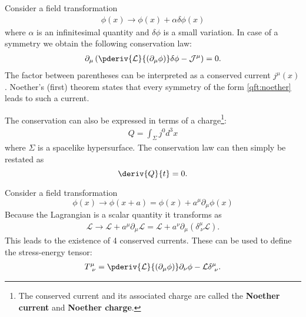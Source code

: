     \begin{theorem}\label{qft:noethers_theorem}
        Consider a field transformation
        \begin{gather}
            \label{qft:noether}
            \phi(x)\rightarrow \phi(x) + \alpha\delta\phi(x)
        \end{gather}
        where $\alpha$ is an infinitesimal quantity and $\delta\phi$ is a small variation. In case of a symmetry we obtain the following conservation law:
        \begin{gather}
            \label{qft:conserved_current}
            \partial_\mu\left(\pderiv{\mathcal{L}}{(\partial_\mu\phi)}\delta\phi - \mathcal{J}^\mu\right) = 0.
        \end{gather}
        The factor between parentheses can be interpreted as a conserved current $j^\mu(x)$. Noether's (first) theorem states that every symmetry of the form \ref{qft:noether} leads to such a current.

        The conservation can also be expressed in terms of a charge\footnote{The conserved current and its associated charge are called the \textbf{Noether current} and \textbf{Noether charge}.}:
        \begin{gather}
            Q = \int_\Sigma j^0d^3x
        \end{gather}
        where $\Sigma$ is a spacelike hypersurface. The conservation law can then simply be restated as \[\deriv{Q}{t} = 0.\]
    \end{theorem}

    \begin{definition}
        Consider a field transformation \[\phi(x)\rightarrow\phi(x+a) = \phi(x) + a^\mu\partial_\mu\phi(x)\] Because the Lagrangian is a scalar quantity it transforms as
        \begin{gather}
            \mathcal{L}\rightarrow\mathcal{L} + a^\mu\partial_\mu\mathcal{L} = \mathcal{L} + a^\nu\partial_\mu(\delta^\mu_{\ \nu}\mathcal{L}).
        \end{gather}
        This leads to the existence of 4 conserved currents. These can be used to define the stress-energy tensor:
        \begin{gather}
            \label{relativity:stress_energy_tensor}
            T^\mu_{\ \nu} = \pderiv{\mathcal{L}}{(\partial_\mu\phi)}\partial_\nu\phi - \mathcal{L}\delta^\mu_{\ \nu}.
        \end{gather}
    \end{definition}

